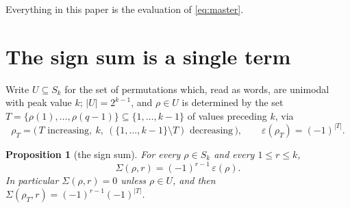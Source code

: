 \documentclass[11pt]{article}
\newtheorem{proposition}[theorem]{Proposition}
\theoremstyle{definition}
\begin{document}
Everything in this paper is the evaluation of \eqref{eq:master}.

\section{The sign sum is a single term}

Write $U\subseteq S_k$ for the set of permutations which, read as words, are unimodal with
peak value $k$; $|U|=2^{k-1}$, and $\rho\in U$ is determined by the set
$T=\{\rho(1),\dots,\rho(q-1)\}\subseteq\{1,\dots,k-1\}$ of values preceding $k$, via
\begin{equation}\label{eq:rhoT}
  \rho_T=\bigl(\,T\text{ increasing},\ k,\ (\{1,\dots,k-1\}\setminus T)\text{ decreasing}\,\bigr),
  \qquad \varepsilon(\rho_T)=(-1)^{|T|}.
\end{equation}

\begin{proposition}[the sign sum]\label{prop:S}
For every $\rho\in S_k$ and every $1\le r\le k$,
\[
  \Sigma(\rho,r)=(-1)^{r-1}\,\varepsilon(\rho).
\]
In particular $\Sigma(\rho,r)=0$ unless $\rho\in U$, and then $\Sigma(\rho_T,r)=(-1)^{r-1}(-1)^{|T|}$.
\end{proposition}
\end{document}
